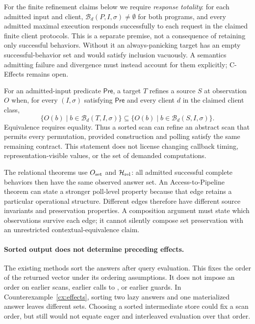 For the finite refinement claims below we require \emph{response totality}:
for each admitted input and client, $\mathcal B_d(P,I,\sigma)\ne\emptyset$
for both programs, and every admitted maximal execution responds successfully
to each request in the claimed finite client protocols. This is a separate
premise, not a consequence of retaining only successful behaviors. Without
it an always-panicking target has an empty successful-behavior set and would
satisfy inclusion vacuously. A semantics admitting failure and divergence
must instead account for them explicitly; C-Effects remains open.

For an admitted-input predicate $\mathsf{Pre}$, a target $T$ refines a source
$S$ at observation $O$ when, for every $(I,\sigma)$ satisfying $\mathsf{Pre}$
and every client $d$ in the claimed client class,
\[
 \{O(b)\mid b\in\mathcal B_d(T,I,\sigma)\}
 \subseteq
 \{O(b)\mid b\in\mathcal B_d(S,I,\sigma)\}.
\]
Equivalence requires equality. Thus a sorted scan can refine an abstract scan
that permits every permutation, provided construction and polling satisfy the
same remaining contract. This statement does not license changing callback
timing, representation-visible values, or the set of demanded computations.

The relational theorems use $O_{\rm set}$ and $\mathcal H_{\rm rel}$: all
admitted successful complete behaviors then have the same observed answer set.
An Access-to-Pipeline theorem can state a stronger poll-level property because
that edge retains a particular operational structure. Different edges therefore
have different source invariants and preservation properties. A composition
argument must state which observations survive each edge; it cannot silently
compose set preservation with an unrestricted contextual-equivalence claim.

\paragraph{Sorted output does not determine preceding effects.}
The existing  methods sort the answers after query evaluation.
This fixes the order of the returned vector under its ordering assumptions.
It does not impose an order on earlier scans, earlier calls to , or
earlier guards. In Counterexample~\ref{cx:effects}, sorting two lazy answers and
one materialized answer leaves different sets. Choosing a sorted intermediate
store could fix a scan order, but still would not equate eager and interleaved
evaluation over that order.

